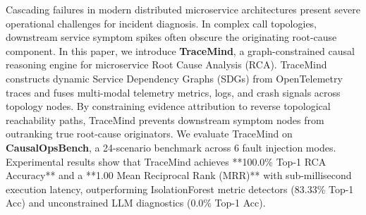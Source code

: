 Cascading failures in modern distributed microservice architectures present severe operational challenges for incident diagnosis. In complex call topologies, downstream service symptom spikes often obscure the originating root-cause component. In this paper, we introduce \textbf{TraceMind}, a graph-constrained causal reasoning engine for microservice Root Cause Analysis (RCA). TraceMind constructs dynamic Service Dependency Graphs (SDGs) from OpenTelemetry traces and fuses multi-modal telemetry metrics, logs, and crash signals across topology nodes. By constraining evidence attribution to reverse topological reachability paths, TraceMind prevents downstream symptom nodes from outranking true root-cause originators. We evaluate TraceMind on \textbf{CausalOpsBench}, a 24-scenario benchmark across 6 fault injection modes. Experimental results show that TraceMind achieves **100.0\% Top-1 RCA Accuracy** and a **1.00 Mean Reciprocal Rank (MRR)** with sub-millisecond execution latency, outperforming IsolationForest metric detectors (83.33\% Top-1 Acc) and unconstrained LLM diagnostics (0.0\% Top-1 Acc).
